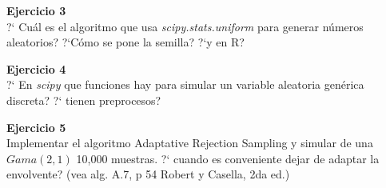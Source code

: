 \documentclass[a4paper, 11pt]{article}
\newenvironment{problem}[2][Ejercicio]
{ \begin{mdframed}[backgroundcolor= red!50] \textbf{#1 #2} \\}
	{  \end{mdframed}}
\begin{document}
\begin{problem}{3}
    ?` Cuál es el algoritmo que usa \textit{scipy.stats.uniform} para generar números aleatorios? ?`Cómo se pone la semilla? ?`y en R?
\end{problem}

\begin{problem}{4}
    ?` En \textit{scipy} que funciones hay para simular un variable aleatoria genérica discreta? ?` tienen preprocesos?
\end{problem}

\begin{problem}{5}
    Implementar el algoritmo Adaptative Rejection Sampling y simular de una $Gama(2,1)$ 10,000 muestras. ?` cuando es conveniente dejar de adaptar la envolvente? (vea alg. A.7, p 54 Robert y Casella, 2da ed.)
\end{problem}



    
\end{document}
